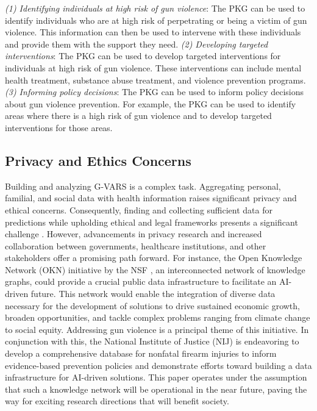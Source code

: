 \documentclass[11pt]{article}
\begin{document}
\newline
\textit{(1) Identifying individuals at high risk of gun violence}: The PKG can be used to identify individuals who are at high risk of perpetrating or being a victim of gun violence. This information can then be used to intervene with these individuals and provide them with the support they need.
\newline
\textit{(2) Developing targeted interventions}: The PKG can be used to develop targeted interventions for individuals at high risk of gun violence. These interventions can include mental health treatment, substance abuse treatment, and violence prevention programs.
\newline
\textit{(3) Informing policy decisions}: The PKG can be used to inform policy decisions about gun violence prevention. For example, the PKG can be used to identify areas where there is a high risk of gun violence and to develop targeted interventions for those areas.

\subsection*{Privacy and Ethics Concerns}
Building and analyzing \textsf{G-VARS} is a complex task. Aggregating personal, familial, and social data with health information raises significant privacy and ethical concerns. Consequently, finding and collecting sufficient data for predictions while upholding ethical and legal frameworks presents a significant challenge \cite{lee2016ethical,nissenbaum2020protecting,ieee_privacy,USCommerce}. However, advancements in privacy research and increased collaboration between governments, healthcare institutions, and other stakeholders offer a promising path forward. 
For instance, the Open Knowledge Network (OKN) initiative by the NSF \cite{nsf_proto_okn_nsf23571,okn_2022}, an interconnected network of knowledge graphs, could provide a crucial public data infrastructure to facilitate an AI-driven future. This network would enable the integration of diverse data necessary for the development of solutions to drive sustained economic growth, broaden opportunities, and tackle complex problems ranging from climate change to social equity. Addressing gun violence is a principal theme of this initiative. In conjunction with this, the National Institute of Justice (NIJ)\cite{nij_gun_violence} is endeavoring to develop a comprehensive database for nonfatal firearm injuries to inform evidence-based prevention policies and demonstrate efforts toward building a data infrastructure for AI-driven solutions. This paper operates under the assumption that such a knowledge network will be operational in the near future, paving the way for exciting research directions that will benefit society.
\end{document}
